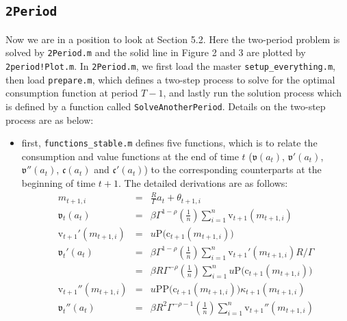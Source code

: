 \documentclass[titlepage,abstract]{\econtex}
\begin{document}
\subsection{\texttt{2Period}}
Now we are in a position to look at Section 5.2. Here the two-period problem is solved by \texttt{2Period.m} and the solid line in Figure 2 and 3 are plotted by \texttt{2period!Plot.m}. In \texttt{2Period.m}, we first load the master \texttt{setup\_everything.m}, then load \texttt{prepare.m}, which defines a two-step process to solve for the optimal consumption function at period $T-1$, and lastly run the solution process which is defined by a function called \texttt{SolveAnotherPeriod}. Details on the two-step process are as below:
\begin{itemize}
     \item first, \texttt{functions\_stable.m} defines five functions, which is to relate the consumption and value functions at the end of time $t$ ($\ensuremath{\mathfrak{v}}(a_{t})$, $\ensuremath{\mathfrak{v}}'(a_{t})$,
            $\ensuremath{\mathfrak{v}}''(a_{t})$, $\ensuremath{\mathfrak{c}}(a_{t})$ and $\ensuremath{\mathfrak{c}}'(a_{t})$) to the corresponding counterparts at the beginning of time $t+1$. The detailed derivations are as follows:
            \begin{eqnarray}
            m_{t+1, i} &=& \frac{R}{\Gamma} {a}_{t} + \theta_{t+1, i} \\
            \ensuremath{\mathfrak{v}}_{t}(a_{t}) & = & \beta \Gamma^{1-\rho} \left(\frac{1}{n}\right)\sum_{i=1}^{n} \ensuremath{\mathrm{v}}_{t+1}(m_{t+1, i}) \\
            \ensuremath{\mathrm{v}}_{t+1}'(m_{t+1, i}) &=& u\text{P}(\ensuremath{\mathrm{c}}_{t+1}(m_{t+1, i})\big) \\
            \ensuremath{\mathfrak{v}}_{t}'(a_{t}) & = & \beta \Gamma^{1-\rho} \left(\frac{1}{n}\right)\sum_{i=1}^{n} \ensuremath{\mathrm{v}}_{t+1}'(m_{t+1, i}) R/\Gamma\\
            &=& \beta R \Gamma^{-\rho} \left(\frac{1}{n}\right)\sum_{i=1}^{n}
            u\text{P}(\ensuremath{\mathrm{c}}_{t+1}(m_{t+1, i})\big) \\
            \ensuremath{\mathrm{v}}_{t+1}''(m_{t+1, i}) &=& u\text{PP}\big(\ensuremath{\mathrm{c}}_{t+1}(m_{t+1, i})\big) \kappa_{t+1}(m_{t+1, i}) \\
            \ensuremath{\mathfrak{v}}_{t}''(a_{t}) & = & \beta R^{2} \Gamma^{-\rho-1} \left(\frac{1}{n}\right)\sum_{i=1}^{n} \ensuremath{\mathrm{v}}_{t+1}''(m_{t+1, i}) \\

\end{eqnarray}
\end{itemize}
\end{document}
